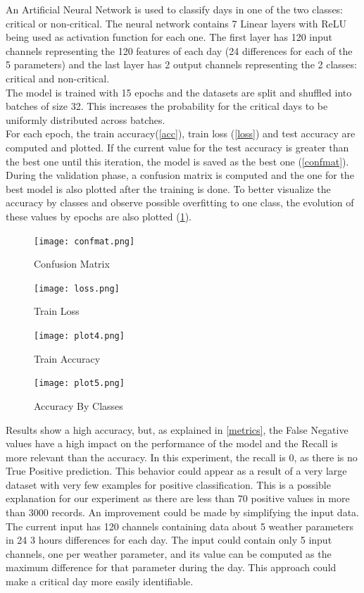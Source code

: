 \documentclass{article}
\begin{document}
An Artificial Neural Network is used to classify days in one of the two classes: critical or non-critical. The neural network contains 7 Linear layers with ReLU being used as activation function for each one. The first layer has 120 input channels representing the 120 features of each day (24 differences for each of the 5 parameters) and the last layer has 2 output channels representing the 2 classes: critical and non-critical.
\\

The model is trained with 15 epochs and the datasets are split and shuffled into batches of size 32. This increases the probability for the critical days to be uniformly distributed across batches. 
\\

For each epoch, the train accuracy(\ref{acc}), train loss (\ref{loss}) and test accuracy are computed and plotted. If the current value for the test accuracy is greater than the best one until this iteration, the model is saved as the best one (\ref{confmat}). During the validation phase, a confusion matrix is computed and the one for the best model is also plotted after the training is done. To better visualize the accuracy by classes and observe possible overfitting to one class, the evolution of these values by epochs are also plotted
(\ref{accCl}).
\\

\begin{figure}[h!] 
\begin{multicols}{2}

\centering
\texttt{[image: confmat.png]}
\caption{Confusion Matrix} 
\label{confmat}

\centering
\texttt{[image: loss.png]}
\caption{Train Loss} 
\label{loss}

\centering
\texttt{[image: plot4.png]}
\caption{Train Accuracy} 
\label{acc}

\centering
\texttt{[image: plot5.png]}
\caption{Accuracy By Classes} 
\label{accCl}
\end{multicols}
\end{figure}

Results show a high accuracy, but, as explained in \ref{metrics}, the False Negative values have a high impact on the performance of the model and the Recall is more relevant than the accuracy. In this experiment, the recall is 0, as there is no True Positive prediction. This behavior could appear as a result of a very large dataset with very few examples for positive classification. This is a possible explanation for our experiment as there are less than 70 positive values in more than 3000 records. An improvement could be made by simplifying the input data. The current input has 120 channels containing data about 5 weather parameters in 24 3 hours differences for each day. The input could contain only 5 input channels, one per weather parameter, and its value can be computed as the maximum difference for that parameter during the day. This approach could make a critical day more easily identifiable.
\end{document}
